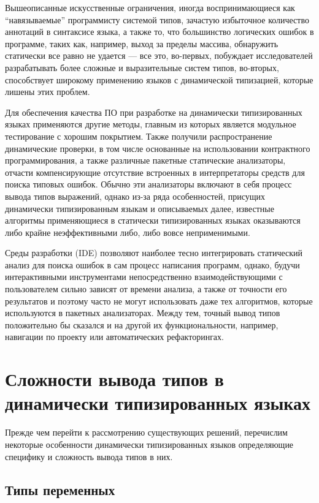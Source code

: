 Вышеописанные искусственные ограничения, иногда воспринимающиеся как
``навязываемые'' программисту системой типов, зачастую избыточное количество
аннотаций в синтаксисе языка, а также то, что большинство логических ошибок в
программе, таких как, например, выход за пределы массива, обнаружить статически
все равно не удается --- все это, во-первых, побуждает исследователей
разрабатывать более сложные и выразительные систем типов, во-вторых,
способствует широкому применению языков с динамической типизацией, которые
лишены этих проблем.

Для обеспечения качества ПО при разработке на динамически типизированных языках
применяются другие методы, главным из которых является модульное тестирование с
хорошим покрытием. Также получили распространение динамические проверки, в том
числе основанные на использовании контрактного программирования, а также
различные пакетные статические анализаторы, отчасти компенсирующие отсутствие
встроенных в интерпретаторы средств для поиска типовых ошибок. Обычно эти
анализаторы включают в себя процесс вывода типов выражений, однако из-за ряда
особенностей, присущих динамически типизированным языкам и описываемых далее,
известные алгоритмы применяющиеся в статически типизированных языках оказываются
либо крайне неэффективными либо, либо вовсе неприменимыми.

Среды разработки (IDE) позволяют наиболее тесно интегрировать статический анализ
для поиска ошибок в сам процесс написания программ, однако, будучи
интерактивными инструментами непосредственно взаимодействующими с пользователем
сильно зависят от времени анализа, а также от точности его результатов и поэтому
часто не могут использовать даже тех алгоритмов, которые используются в пакетных
анализаторах. Между тем, точный вывод типов положительно бы сказался и на
другой их функциональности, например, навигации по проекту или автоматических
рефакторингах.

\section{Сложности вывода типов в динамически типизированных языках}
\label{sec:difficulties}

Прежде чем перейти к рассмотрению существующих решений, перечислим некоторые
особенности динамически типизированных языков определяющие специфику и сложность
вывода типов в них.

\subsection{Типы переменных}

